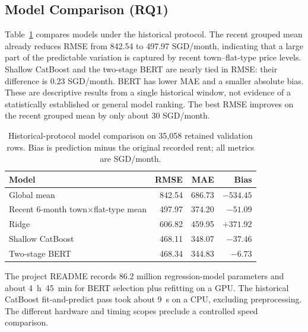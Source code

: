 \subsection{Model Comparison (RQ1)}
Table~\ref{tab:model_comparison} compares models under the historical protocol.  The recent grouped mean already reduces RMSE from 842.54 to 497.97 SGD/month, indicating that a large part of the predictable variation is captured by recent town--flat-type price levels.  Shallow CatBoost and the two-stage BERT are nearly tied in RMSE: their difference is 0.23 SGD/month.  BERT has lower MAE and a smaller absolute bias.  These are descriptive results from a single historical window, not evidence of a statistically established or general model ranking.  The best RMSE improves on the recent grouped mean by only about 30 SGD/month.

\begin{table}[t]
\caption{Historical-protocol model comparison on 35,058 retained validation rows.  Bias is prediction minus the original recorded rent; all metrics are SGD/month.}
\label{tab:model_comparison}
\centering
\footnotesize
\begin{tabularx}{\columnwidth}{@{}Xrrr@{}}
\toprule
Model & RMSE & MAE & Bias \\
\midrule
Global mean & 842.54 & 686.73 & $-534.45$ \\
Recent 6-month town$\times$flat-type mean & 497.97 & 374.20 & $-51.09$ \\
Ridge & 606.82 & 459.95 & $+371.92$ \\
Shallow CatBoost & 468.11 & 348.07 & $-37.46$ \\
Two-stage BERT & 468.34 & 344.83 & $-6.73$ \\
\bottomrule
\end{tabularx}
\end{table}

The project README records 86.2 million regression-model parameters and about 4~h~45~min for BERT selection plus refitting on a GPU.  The historical CatBoost fit-and-predict pass took about 9~s on a CPU, excluding preprocessing.  The different hardware and timing scopes preclude a controlled speed comparison.


